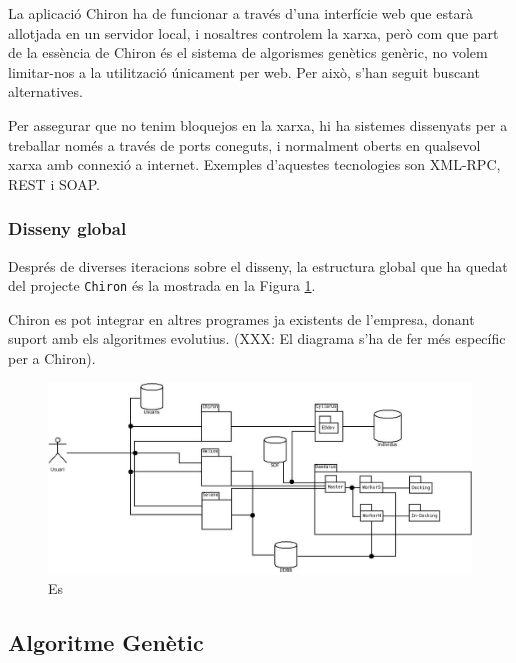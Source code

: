 La aplicació Chiron ha de funcionar a través d'una interfície web que estarà
allotjada en un servidor local, i nosaltres controlem la xarxa, però com que
part de la essència de Chiron és el sistema de algorismes genètics genèric, no
volem limitar-nos a la utilització únicament per web.  Per això, s'han seguit
buscant alternatives.

Per assegurar que no tenim bloquejos en la xarxa, hi ha sistemes dissenyats per a
treballar només a través de ports coneguts, i normalment oberts en qualsevol
xarxa amb connexió a internet.  Exemples d'aquestes tecnologies son XML-RPC, REST
i SOAP.

\subsubsection{Disseny global} %
\label{ssub:Diseny global}

Després de diverses iteracions sobre el disseny, la estructura global que ha
quedat del projecte \texttt{Chiron} és la mostrada en la Figura \ref{fig:disenyChiron}.

Chiron es pot integrar en altres programes ja existents de l'empresa, donant
suport amb els algoritmes evolutius.  (XXX: El diagrama s'ha de fer més
específic per a Chiron).

\begin{figure}[h]
	\begin{center}
		\includegraphics[scale=0.4]{chiron/arquitectura_global_chiron.jpg}
	\end{center}
	\caption{Es}
	\label{fig:disenyChiron}
\end{figure}


\subsection{Algoritme Genètic} %
	\label{sub:Algoritme Genetic}

